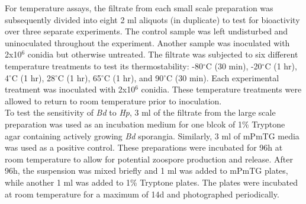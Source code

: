 \indent For temperature assays, the filtrate from each small scale preparation was subsequently divided into eight 2 ml aliquots (in duplicate) to test for bioactivity over three separate experiments. The control sample was left undisturbed and uninoculated throughout the experiment. Another sample was inoculated with 2x10$^{6}$ conidia but otherwise untreated. The filtrate was subjected to six different temperature treatments to test its thermostability: -80$^{\circ}$C (30 min), -20$^{\circ}$C (1 hr), 4$^{\circ}$C (1 hr), 28$^{\circ}$C (1 hr), 65$^{\circ}$C (1 hr), and 90$^{\circ}$C (30 min). Each experimental treatment was inoculated with 2x10$^{6}$ conidia. These temperature treatments were allowed to return to room temperature prior to inoculation.\\
\indent To test the sensitivity of \textit{Bd} to \textit{Hp}, 3 ml of the filtrate from the large scale preparation was used as an incubation medium for one blcok of 1\% Tryptone agar containing actively growing \textit{Bd} sporangia. Similarly, 3 ml of mPmTG media was used as a positive control. These preparations were incubated for 96h at room temperature to allow for potential zoospore production and release. After 96h, the suspension was mixed briefly and 1 ml was added to mPmTG plates, while another 1 ml was added to 1\% Tryptone plates. The plates were incubated at room temperature for a maximum of 14d and photographed periodically.\\
